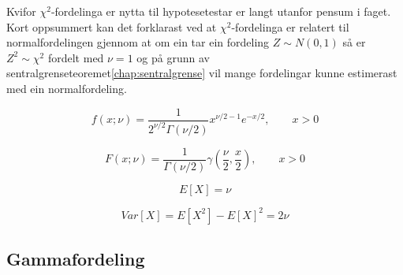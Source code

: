 Kvifor $\chi^2$-fordelinga er nytta til hypotesetestar er langt utanfor pensum i faget. Kort oppsummert kan det forklarast ved at $\chi^2$-fordelinga er relatert til normalfordelingen gjennom at om ein tar ein fordeling $Z \sim N(0,1)$ så er $Z^2 \sim \chi^2$ fordelt med $\nu = 1$ og på grunn av sentralgrenseteoremet\ref{chap:sentralgrense} vil mange fordelingar kunne estimerast med ein normalfordeling.

\begin{equation}
    f(x; \nu) = \frac{1}{2^{\nu/2}\Gamma(\nu/2)}x^{\nu/2 - 1}e^{-x/2}, \qquad x > 0
\end{equation}

\begin{equation}
    F(x; \nu) = \frac{1}{\Gamma(\nu / 2)} \gamma(\frac{\nu}{2}, \frac{x}{2}), \qquad x > 0
\end{equation}

\begin{equation}
    E[X] = \nu
\end{equation}

\begin{equation}
    Var[X] = E[X^2] - E[X]^2 = 2\nu
\end{equation}

\subsection{Gammafordeling}
